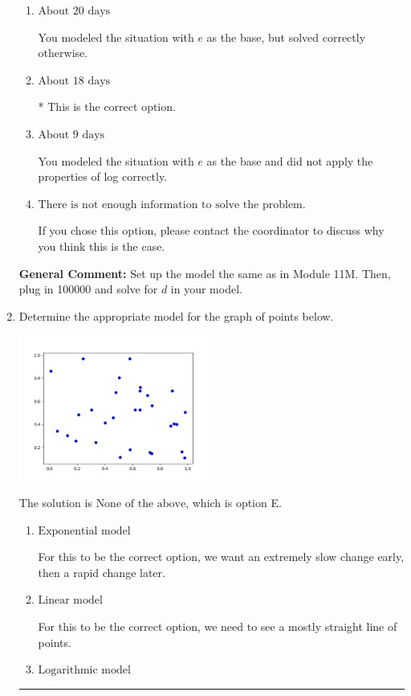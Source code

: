 \documentclass{extbook}[14pt]
\newcommand{\litem}[1]{\item #1

\rule{\textwidth}{0.4pt}}
\begin{document}
\begin{enumerate}
{\begin{enumerate}[label=\Alph*.]
You modeled the situation correctly but did not apply the properties of log correctly.
\item \( \text{About } 20 \text{ days} \)

You modeled the situation with $e$ as the base, but solved correctly otherwise.
\item \( \text{About } 18 \text{ days} \)

* This is the correct option.
\item \( \text{About } 9 \text{ days} \)

You modeled the situation with $e$ as the base and did not apply the properties of log correctly.
\item \( \text{There is not enough information to solve the problem.} \)

If you chose this option, please contact the coordinator to discuss why you think this is the case.
\end{enumerate}

\textbf{General Comment:} Set up the model the same as in Module 11M. Then, plug in 100000 and solve for $d$ in your model.
}
\litem{
Determine the appropriate model for the graph of points below.

\begin{center}
    \includegraphics[width=0.5\textwidth]{../Figures/identifyModelGraph12CopyB.png}
\end{center}


The solution is \( \text{None of the above} \), which is option E.\begin{enumerate}[label=\Alph*.]
\item \( \text{Exponential model} \)

For this to be the correct option, we want an extremely slow change early, then a rapid change later.
\item \( \text{Linear model} \)

For this to be the correct option, we need to see a mostly straight line of points.
\item \( \text{Logarithmic model} \)


\end{enumerate}}
\end{enumerate}
\end{document}
